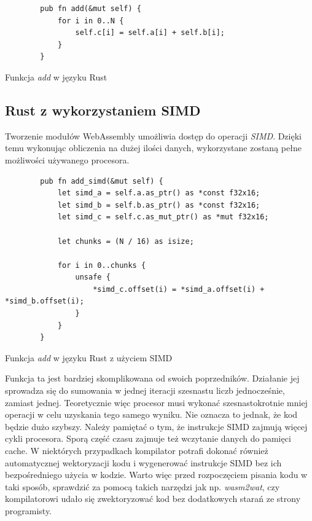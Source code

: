 \documentclass[language=polish,type=master]{aghmodern}
\begin{document}
\begin{listing}[H]
    \begin{verbatim}
        pub fn add(&mut self) {
            for i in 0..N {
                self.c[i] = self.a[i] + self.b[i];
            }
        }
    \end{verbatim}
    \caption{Funkcja \emph{add} w języku Rust}
\end{listing}

\subsection{Rust z wykorzystaniem SIMD}
Tworzenie modułów WebAssembly umożliwia dostęp do operacji \emph{SIMD}\footnotemark{}.
Dzięki temu wykonując obliczenia na dużej ilości danych, wykorzystane zostaną pełne możliwości używanego procesora.

\begin{listing}[H]
    \begin{verbatim}
        pub fn add_simd(&mut self) {
            let simd_a = self.a.as_ptr() as *const f32x16;
            let simd_b = self.b.as_ptr() as *const f32x16;
            let simd_c = self.c.as_mut_ptr() as *mut f32x16;
    
            let chunks = (N / 16) as isize;

            for i in 0..chunks {
                unsafe {
                    *simd_c.offset(i) = *simd_a.offset(i) + *simd_b.offset(i);
                }
            }
        }
    \end{verbatim}
    \caption{Funkcja \emph{add} w języku Rust z użyciem SIMD}
\end{listing}

Funkcja ta jest bardziej skomplikowana od swoich poprzedników.
Działanie jej sprowadza się do sumowania w jednej iteracji szesnastu liczb jednocześnie, zamiast jednej.
Teoretycznie więc procesor musi wykonać szesnastokrotnie mniej operacji w celu uzyskania tego samego wyniku.
Nie oznacza to jednak, że kod będzie dużo szybszy.
Należy pamiętać o tym, że instrukcje SIMD zajmują więcej cykli procesora.
Sporą część czasu zajmuje też wczytanie danych do pamięci cache.
W niektórych przypadkach kompilator potrafi dokonać również automatycznej wektoryzacji kodu i wygenerować instrukcje SIMD bez ich bezpośredniego użycia w kodzie.
Warto więc przed rozpoczęciem pisania kodu w taki sposób, sprawdzić za pomocą takich narzędzi jak np. \emph{wasm2wat}\footnotemark{}, czy kompilatorowi udało się zwektoryzować kod bez dodatkowych starań ze strony programisty.
\end{document}
